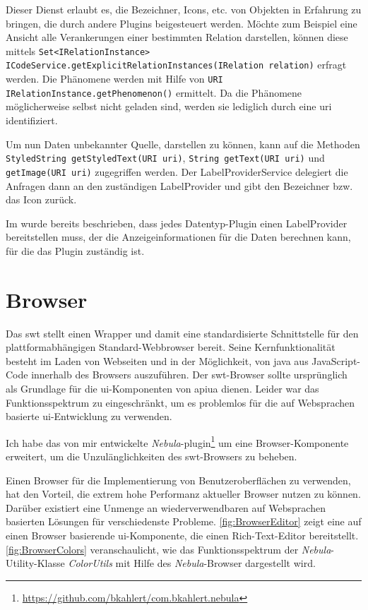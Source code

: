 Dieser Dienst erlaubt es, die Bezeichner, Icons, etc. von Objekten in Erfahrung zu bringen, die durch andere Plugins beigesteuert werden. Möchte zum Beispiel eine Ansicht alle Verankerungen einer bestimmten Relation darstellen, können diese mittels \texttt{Set<IRelationInstance> ICodeService.getExplicitRelationInstances(IRelation relation)} erfragt werden. Die Phänomene werden mit Hilfe von \texttt{URI IRelationInstance.getPhenomenon()} ermittelt. Da die Phänomene möglicherweise selbst nicht geladen sind, werden sie lediglich durch eine \gls{uri} identifiziert.

Um nun Daten unbekannter Quelle, darstellen zu können, kann auf die Methoden \texttt{StyledString getStyledText(URI uri)}, \texttt{String getText(URI uri)} und \texttt{getImage(URI uri)} zugegriffen werden. Der LabelProviderService delegiert die Anfragen dann an den zuständigen LabelProvider und gibt den Bezeichner bzw. das Icon zurück.

Im  wurde bereits beschrieben, dass jedes Datentyp-Plugin einen LabelProvider bereitstellen muss, der die Anzeigeinformationen  für die Daten berechnen kann, für die das Plugin zuständig ist.



\section{Browser}
\label{sec:browser}

Das \gls{swt} stellt einen Wrapper und damit eine standardisierte Schnittstelle für den plattformabhängigen Standard-Webbrowser bereit. Seine Kernfunktionalität besteht im Laden von Webseiten und in der Möglichkeit, von \gls{java} aus JavaScript-Code innerhalb des Browsers auszuführen. Der \gls{swt}-Browser sollte ursprünglich als Grundlage für die \acrshort{ui}-Komponenten von \gls{apiua} dienen. Leider war das Funktionsspektrum zu eingeschränkt, um es problemlos für die auf Websprachen basierte \acrshort{ui}-Entwicklung zu verwenden.

Ich habe das von mir entwickelte \textit{Nebula}-\gls{plugin}\footnote{\url{https://github.com/bkahlert/com.bkahlert.nebula}} um eine Browser-Komponente erweitert, um die Unzulänglichkeiten des \acrshort{swt}-Browsers zu beheben.

Einen Browser für die Implementierung von Benutzeroberflächen zu verwenden, hat den Vorteil, die extrem hohe Performanz aktueller Browser nutzen zu können. Darüber existiert eine Unmenge an wiederverwendbaren auf Websprachen basierten Lösungen für verschiedenste Probleme. \autoref{fig:BrowserEditor} zeigt eine auf einen Browser basierende \acrshort{ui}-Komponente, die einen Rich-Text-Editor bereitstellt. \autoref{fig:BrowserColors} veranschaulicht, wie das Funktionsspektrum der \textit{Nebula}-Utility-Klasse \textit{ColorUtils} mit Hilfe des \textit{Nebula}-Browser dargestellt wird.

